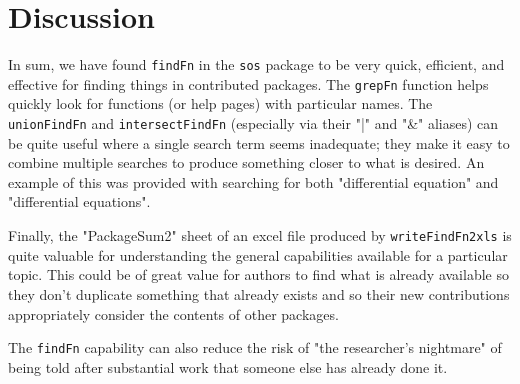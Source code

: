 \section*{Discussion}
In sum, we have found {\tt findFn} in the {\tt sos} package to
be very quick, efficient, and effective for finding things in
contributed packages.  The {\tt grepFn} function helps quickly
look for functions (or help pages) with particular names.
The {\tt unionFindFn} and {\tt intersectFindFn} (especially via
their "|" and "\&" aliases) can be quite useful where a single
search term seems inadequate;  they make it easy to combine
multiple searches to produce something closer to what is desired.
An example of this was provided with searching for both
"differential equation" and "differential equations".

Finally, the "PackageSum2" sheet of an excel file produced by
{\tt writeFindFn2xls} is quite valuable for understanding the
general capabilities available for a particular topic.
This could be of great value for authors to find what is already
available so they don't duplicate something that already exists
and so their new contributions appropriately consider
the contents of other packages.

The {\tt findFn} capability can also reduce the risk
of "the researcher's nightmare" of being told after
substantial work that someone else has already done it.


